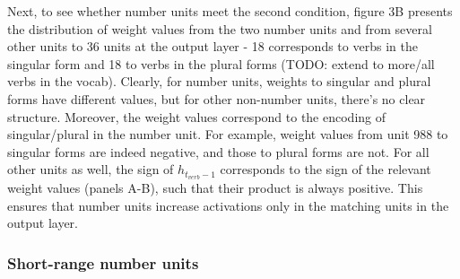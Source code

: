 Next, to see whether number units meet the second condition, figure 3B presents the distribution of weight values from the two number units and from several other units to 36 units at the output layer - 18 corresponds to verbs in the singular form and 18 to verbs in the plural forms (TODO: extend to more/all verbs in the vocab). 
Clearly, for number units, weights to singular and plural forms have different values, but for other non-number units, there's no clear structure. 
Moreover, the weight values correspond to the encoding of singular/plural in the number unit. 
For example, weight values from unit 988 to singular forms are indeed negative, and those to plural forms are not. 
For all other units as well, the sign of $h_{t_{verb}-1}$ corresponds to the sign of the relevant weight values (panels A-B), such that their product is always positive. 
This ensures that number units increase activations only in the matching units in the output layer.

\subsubsection{Short-range number units}

